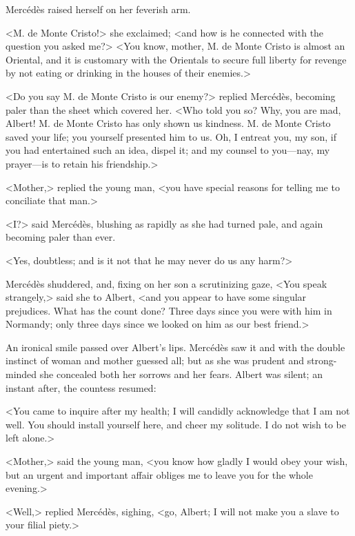  Mercédès raised herself on her feverish arm. 

 <M. de Monte Cristo!> she exclaimed; <and how is he connected with the question you asked me?>  <You know, mother, M. de Monte Cristo is almost an Oriental, and it is customary with the Orientals to secure full liberty for revenge by not eating or drinking in the houses of their enemies.> 

 <Do you say M. de Monte Cristo is our enemy?> replied Mercédès, becoming paler than the sheet which covered her. <Who told you so? Why, you are mad, Albert! M. de Monte Cristo has only shown us kindness. M. de Monte Cristo saved your life; you yourself presented him to us. Oh, I entreat you, my son, if you had entertained such an idea, dispel it; and my counsel to you—nay, my prayer—is to retain his friendship.> 

 <Mother,> replied the young man, <you have special reasons for telling me to conciliate that man.> 

 <I?> said Mercédès, blushing as rapidly as she had turned pale, and again becoming paler than ever. 

 <Yes, doubtless; and is it not that he may never do us any harm?> 

 Mercédès shuddered, and, fixing on her son a scrutinizing gaze, <You speak strangely,> said she to Albert, <and you appear to have some singular prejudices. What has the count done? Three days since you were with him in Normandy; only three days since we looked on him as our best friend.> 

 An ironical smile passed over Albert's lips. Mercédès saw it and with the double instinct of woman and mother guessed all; but as she was prudent and strong-minded she concealed both her sorrows and her fears. Albert was silent; an instant after, the countess resumed: 

 <You came to inquire after my health; I will candidly acknowledge that I am not well. You should install yourself here, and cheer my solitude. I do not wish to be left alone.> 

 <Mother,> said the young man, <you know how gladly I would obey your wish, but an urgent and important affair obliges me to leave you for the whole evening.> 

 <Well,> replied Mercédès, sighing, <go, Albert; I will not make you a slave to your filial piety.> 

